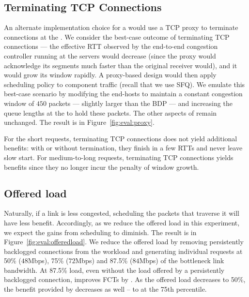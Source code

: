 \subsection{Terminating TCP Connections}\label{s:eval:proxy}
An alternate implementation choice for a \name would use a TCP proxy to terminate connections at the \inbox. 
We consider the best-case outcome of terminating TCP connections --- the effective RTT observed by the end-to-end congestion controller running at the servers would decrease (since the proxy would acknowledge its segments much faster than the original receiver would), and it would grow its window rapidly.
A proxy-based design would then apply scheduling policy to component traffic (recall that we use SFQ).
We emulate this best-case scenario by modifying the end-hosts to maintain a constant congestion window of $450$ packets --- slightly larger than the BDP --- and increasing the queue lengths at the \inbox to hold these packets. The other aspects of \name remain unchanged.
The result is in Figure~\ref{fig:eval:proxy}.
%

%
For the short requests, terminating TCP connections does not yield additional benefits: with or without termination, they finish in a few RTTs and never leave slow start.
For medium-to-long requests, terminating TCP connections yields benefits since they no longer incur the penalty of window growth.



\subsection{Offered load}\label{s:eval:offeredload}
Naturally, if a link is less congested, scheduling the packets that traverse it will have less benefit. Accordingly, as we reduce the offered load in this experiment, we expect the gains from scheduling to diminish. The result is in Figure~\ref{fig:eval:offeredload}. We reduce the offered load by removing persistently backlogged connections from the workload and generating individual requests at 50\% ($48$Mbps), 75\% ($72$Mbps) and 87.5\% ($84$Mbps) of the bottleneck link bandwidth.
At 87.5\% load, even without the load offered by a persistently backlogged connection, \name improves FCTs by . 
As the offered load decreases to 50\%, the benefit provided by \name decreases as well -- to  at the 75th percentile.


